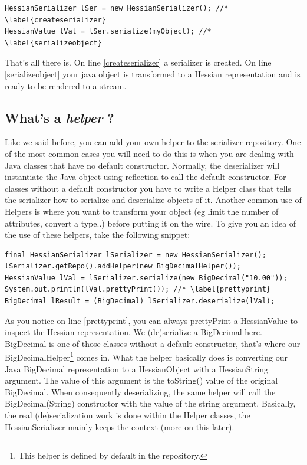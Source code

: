 \documentclass[a4paper]{article}
\begin{document}
\medskip
\begin{lstlisting}
HessianSerializer lSer = new HessianSerializer(); //* \label{createserializer} 
HessianValue lVal = lSer.serialize(myObject); //* \label{serializeobject}
\end{lstlisting}
\medskip

That's all there is. On line \ref{createserializer} a serializer is created. On line \ref{serializeobject} your java object is transformed to a Hessian representation and is ready to be rendered to a stream.

\subsection{What's a \emph{helper} ?}

Like we said before, you can add your own helper to the serializer repository. 
One of the most common cases you will need to do this is when you are dealing with Java classes that have no default constructor.
Normally, the deserializer will instantiate the Java object using reflection to call the default constructor.
For classes without a default constructor you have to write a Helper class that tells the serializer how to serialize and deserialize objects of it. Another common use of Helpers is where you want to transform your object (eg limit the number of attributes, convert a type..) before putting it on the wire. To give you an idea of the use of these helpers, take the following snippet:

\medskip
\begin{lstlisting}
final HessianSerializer lSerializer = new HessianSerializer();
lSerializer.getRepo().addHelper(new BigDecimalHelper());
HessianValue lVal = lSerializer.serialize(new BigDecimal("10.00"));
System.out.println(lVal.prettyPrint()); //* \label{prettyprint}
BigDecimal lResult = (BigDecimal) lSerializer.deserialize(lVal);
\end{lstlisting}
\medskip

As you notice on line \ref{prettyprint}, you can always prettyPrint a HessianValue to inspect the Hessian representation. We (de)serialize a BigDecimal here. BigDecimal is one of those classes without a default constructor, that's where our BigDecimalHelper\footnote{This helper is defined by default in the repository.} comes in.  What the helper basically does is converting our Java BigDecimal representation to a HessianObject with a HessianString argument. The value of this argument is the toString() value of the original BigDecimal. When consequently deserializing, the same helper will call the BigDecimal(String) constructor with the value of the string argument. Basically, the real (de)serialization work is done within the Helper classes, the HessianSerializer mainly keeps the context (more on this later).
\end{document}

